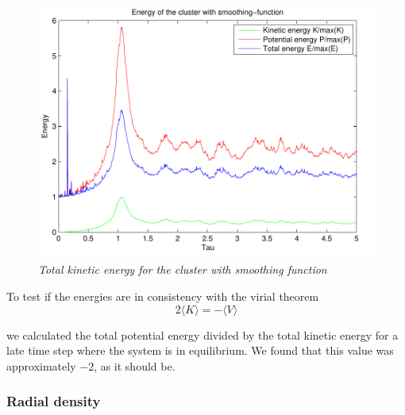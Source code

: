 \documentclass[a4paper,12pt, english]{article}
\begin{document}
\begin{figure}
        \includegraphics[scale=0.5]{energy_n1000t5_N100.pdf}
        \caption{\textit{Total kinetic energy for the cluster with smoothing function}}
        \label{fig:totE}
\end{figure}

To test if the energies are in consistency with the virial theorem 
\[
2\langle K\rangle = -\langle V \rangle
\]

we calculated the total potential energy divided by the total kinetic energy for a late time step where the system is in equilibrium. We found that this value was approximately $-2$, as it should be.

\subsubsection*{Radial density}
\end{document}
